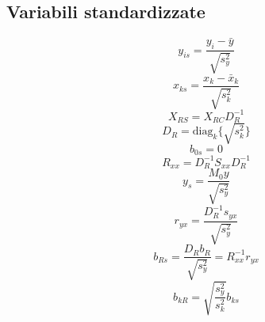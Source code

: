 \documentclass[a4paper, landscape]{article}
\begin{document}
\begin{multicols}{3}
\subsection{Variabili standardizzate}
\begin{equation}
y_{is}=\frac{y_i-\bar{y}}{\sqrt{s^2_y}} \end{equation}
\begin{equation} x_{ks}=\frac{x_k-\bar{x}_k}{\sqrt{s^2_k}} \end{equation}
\begin{equation}
X_{RS}=X_{RC}D_R^{-1} \end{equation}
\begin{equation} D_R=\textrm{diag}_k\{\sqrt{s^2_k}\} \end{equation}
\begin{equation}
b_{0s}=0 \end{equation}
\begin{equation} R_{xx}=D_R^{-1}S_{xx}D_R^{-1}\end{equation}
\begin{equation}
y_s=\frac{M_0 y}{\sqrt{s^2_y}} \end{equation}
\begin{equation} r_{yx}=\frac{D_R^{-1}s_{yx}}{\sqrt{s^2_y}} \end{equation}
\begin{equation}
b_{Rs}=\frac{D_R b_R}{\sqrt{s^2_y}}=R_{xx}^{-1}r_{yx} \end{equation}
\begin{equation} b_{kR}=\sqrt{\frac{s^2_y}{s^2_k}}b_{ks}
\end{equation}

\end{multicols}
\end{document}
